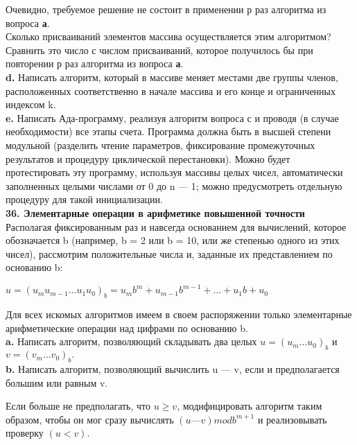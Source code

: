 \documentclass{mai_book}
\begin{document}
Очевидно, требуемое решение не состоит в применении р раз алгоритма из вопроса \textbf{а}.\\

Сколько присваиваний элементов массива осуществляется этим алгоритмом? Сравнить это число с числом присваиваний, которое получилось бы при повторении р раз алгоритма из вопроса \textbf{а}.\\

\textbf{d.} Написать алгоритм, который в массиве меняет местами две группы членов, расположенных соответственно в начале массива и его конце и ограниченных индексом k.\\

\textbf{e.} Написать Ада-программу, реализуя алгоритм вопроса с и проводя (в случае необходимости) все этапы счета. Программа должна быть в высшей степени модульной (разделить чтение параметров, фиксирование промежуточных результатов и процедуру циклической перестановки). Можно будет протестировать эту программу, используя массивы целых чисел, автоматически заполненных целыми числами от 0 до n — 1; можно предусмотреть отдельную процедуру для такой инициализации.\\

\noindent
\textbf{36. Элементарные операции в арифметике повышенной точности}\\

Располагая фиксированным раз и навсегда основанием для вычислений, которое обозначается b (например, b = 2 или b = 10, или же степенью одного из этих чисел), рассмотрим положительные числа и, заданные их представлением по основанию b:
\begin{center}
$u = (u_{m}u_{m-1} ... u_{1}u_{0})_{b} = u_{m}b^{m} + u_{m-1}b^{m-1} + ... + u_{1}b + u_{0}$
\end{center}
Для всех искомых алгоритмов имеем в своем распоряжении только элементарные арифметические операции над цифрами по основанию b.\\

\textbf{a.} Написать алгоритм, позволяющий складывать два целых $u = (u_{m} ... u_{0})_{b}$ и $v = (v_{m} ... v_{0})_{b}.$\\

\textbf{b.} Написать алгоритм, позволяющий вычислить u — v, если и предполагается большим или равным v.
\newpage

Если больше не предполагать, что $u \geqslant v$, модифицировать алгоритм таким образом, чтобы он мог сразу вычислять $(u — v) mod b^{m+1}$ и реализовывать проверку $(u < v)$.\\
\end{document}
